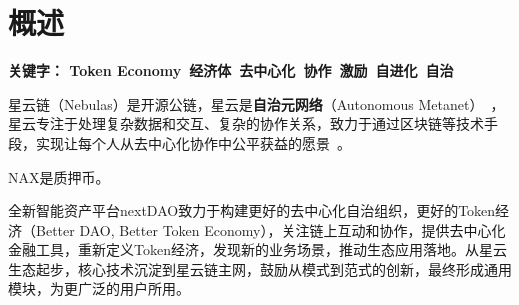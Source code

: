 \section{概述}

\textbf{关键字： Token Economy\ 经济体\ 去中心化\ 协作\ 激励\ 自进化\ 自治 }

\vspace{2em}

星云链（Nebulas）是开源公链，星云是\textbf{自治元网络}（Autonomous Metanet）~\cite{AutonomousMetanet}，星云专注于处理复杂数据和交互、复杂的协作关系，致力于通过区块链等技术手段，实现让每个人从去中心化协作中公平获益的愿景~\cite{vision}。

NAX是质押币。

全新智能资产平台nextDAO致力于构建更好的去中心化自治组织，更好的Token经济（Better DAO, Better Token Economy），关注链上互动和协作，提供去中心化金融工具，重新定义Token经济，发现新的业务场景，推动生态应用落地。从星云生态起步，核心技术沉淀到星云链主网，鼓励从模式到范式的创新，最终形成通用模块，为更广泛的用户所用。